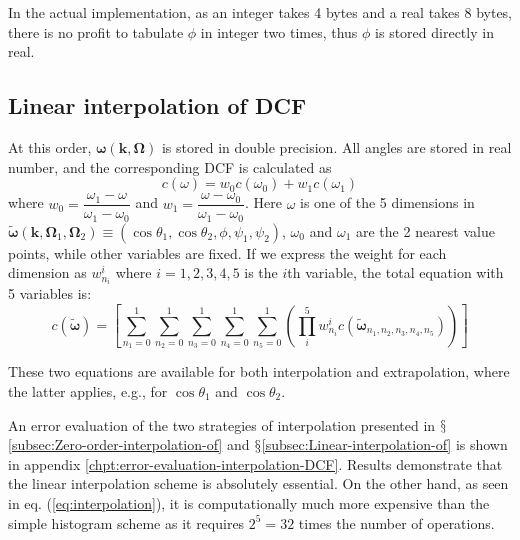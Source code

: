 In the actual implementation, as an integer takes 4 bytes and a real
takes 8 bytes, there is no profit to tabulate $\phi$ in integer two
times, thus $\phi$ is stored directly in real.

\subsection{Linear interpolation of DCF\label{subsec:Linear-interpolation-of}}

At this order, $\boldsymbol{\omega}(\mathbf{k},\mathbf{\Omega})$
is stored in double precision. All angles are stored in real number,
and the corresponding \acs{DCF} is calculated as
\begin{equation}
c(\omega)=w_{0}c(\omega_{0})+w_{1}c(\omega_{1})
\end{equation}
where $w_{0}=\dfrac{\omega_{1}-\omega}{\omega_{1}-\omega_{0}}$ and
$w_{1}=\dfrac{\omega-\omega_{0}}{\omega_{1}-\omega_{0}}$. Here
$\omega$ is one of the 5 dimensions in $\tilde{\boldsymbol{\omega}}(\mathbf{k},\mathbf{\Omega}_{1},\mathbf{\Omega}_{2})\equiv(\cos\theta_{1},\cos\theta_{2},\phi,\psi_{1},\psi_{2})$,
$\omega_{0}$ and $\omega_{1}$ are the 2 nearest value points, while
other variables are fixed. If we express the weight for each dimension
as $w_{n_{i}}^{i}$ where $i=1,2,3,4,5$ is the $i$th variable, the
total equation with 5 variables is:
\begin{equation}
c(\tilde{\boldsymbol{\omega}})=\left[\sum_{n_{1}=0}^{1}\sum_{n_{2}=0}^{1}\sum_{n_{3}=0}^{1}\sum_{n_{4}=0}^{1}\sum_{n_{5}=0}^{1}\left(\prod_{i}^{5}w_{n_{i}}^{i}c(\tilde{\boldsymbol{\omega}}_{n_{1},n_{2},n_{3},n_{4},n_{5}})\right)\right]\label{eq:interpolation}
\end{equation}

These two equations are available for both interpolation and extrapolation,
where the latter applies, e.g., for $\cos\theta_{1}$ and $\cos\theta_{2}$. 

An error evaluation of the two strategies of interpolation presented
in $\mathsection$\ref{subsec:Zero-order-interpolation-of} and $\mathsection$\ref{subsec:Linear-interpolation-of}
is shown in appendix \ref{chpt:error-evaluation-interpolation-DCF}.
Results demonstrate that the linear interpolation scheme is absolutely
essential. On the other hand, as seen in eq. (\ref{eq:interpolation}),
it is computationally much more expensive than the simple histogram
scheme as it requires $2^{5}=32$ times the number of operations.

